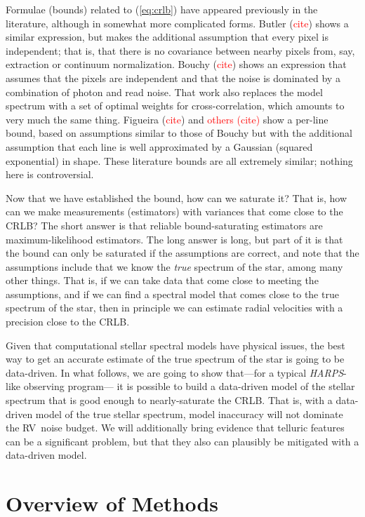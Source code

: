 \documentclass[modern]{aastex61}
\newcommand{\todo}[1]{\textcolor{red}{#1}}  %
\newcommand{\acronym}[1]{{\small{#1}}}
\newcommand{\project}[1]{\textsl{#1}}
\newcommand{\HARPS}{\project{\acronym{HARPS}}}
\newcommand{\RV}{\acronym{RV}}
\newcommand{\CRLB}{\acronym{CRLB}}
\begin{document}
Formulae (bounds) related to (\ref{eq:crlb}) have appeared previously
in the literature, although in somewhat more complicated forms.
Butler (\todo{cite}) shows a similar expression, but makes the additional
assumption that every pixel is independent; that is, that there is no
covariance between nearby pixels from, say, extraction or continuum normalization.
Bouchy (\todo{cite}) shows an expression that assumes that the pixels
are independent and that the noise is dominated by a combination of photon
and read noise. 
That work also replaces the model spectrum with a set of optimal
weights for cross-correlation, which amounts to very much the same thing.
Figueira (\todo{cite}) and \todo{others (cite)} show a per-line
bound, based on assumptions similar to those of Bouchy but with the additional assumption that
each line is well approximated by a Gaussian (squared exponential) in shape.
These literature bounds are all extremely similar; nothing here is controversial.

Now that we have established the bound, how can we saturate it? That is,
how can we make measurements (estimators)  with variances that come close to the \CRLB?
The short answer is that reliable bound-saturating estimators are maximum-likelihood estimators.
The long answer is long, but part of it is that the bound can only be saturated if the
assumptions are correct, and note that the assumptions include that we know the
\emph{true} spectrum of the star, among many other things.
That is, if we can take data that come close to meeting the assumptions, and
if we can find a spectral model that comes close to the true spectrum of the star,
then in principle we can estimate radial velocities with a precision close to the \CRLB.

Given that computational stellar spectral models have physical issues, the best way
to get an accurate estimate of the true spectrum of the star is going to be data-driven.
In what follows, we are going to show that---for a typical \HARPS-like observing program---%
it is possible to build a data-driven model of the stellar spectrum that is good enough
to nearly-saturate the \CRLB.
That is, with a data-driven model of the true stellar spectrum, model inaccuracy will
not dominate the \RV\ noise budget.
We will additionally bring evidence that telluric features can be a significant problem,
but that they also can plausibly be mitigated with a data-driven model.

\section{Overview of Methods}
\label{s:methods}
\end{document}
